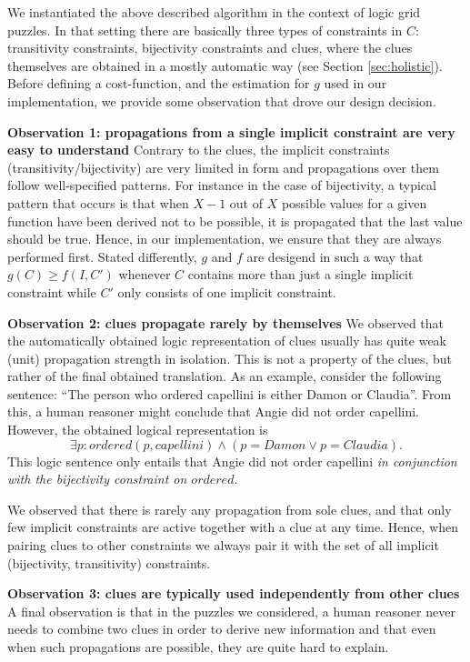 We instantiated the above described algorithm in the context of logic grid puzzles. 
In that setting there are basically three types of constraints in $C$: transitivity constraints, bijectivity constraints and clues, where the clues themselves are obtained in a mostly automatic way (see Section \ref{sec:holistic}). 
Before defining a cost-function, and the estimation for $g$ used in our implementation, we provide some observation that drove our design decision. 

\textbf{Observation 1: propagations from a single implicit constraint are very easy to understand} Contrary to the clues, the implicit constraints (transitivity/bijectivity) are very limited in form and propagations over them follow well-specified patterns. 
For instance in the case of bijectivity, a typical pattern that occurs is that when $X-1$ out of $X$ possible values for a given function have been derived not to be possible, it is propagated that the last value should be true. 
Hence, in our implementation, we ensure that they are always performed first. Stated differently, $g$ and $f$ are desigend in such a way that $g(C)\geq f(I,C')$ whenever $C$ contains more than just a single implicit constraint while $C'$ only consists of one implicit constraint.  

\textbf{Observation 2: clues propagate rarely by themselves}
We observed that the automatically obtained logic representation of clues usually has quite weak (unit) propagation strength in isolation. 
This is not a property of the clues, but rather of the final obtained translation. As an example, consider the following sentence: 
``The person who ordered capellini is either Damon or Claudia''. From this, a human reasoner might conclude that Angie did not order capellini. 
However, the obtained logical representation is 
\[\exists p: ordered(p,capellini)\land (p = Damon\lor p = Claudia).\]
This logic sentence only entails that Angie did not order capellini \emph{in conjunction with the bijectivity constraint on $ordered$}. 

We observed that there is rarely any propagation from sole clues, and that only few implicit constraints are active together with a clue at any time. Hence, when pairing clues to other constraints we always pair it with the set of all implicit (bijectivity, transitivity) constraints.

\textbf{Observation 3: clues are typically used independently from other clues} 
A final observation is that in the puzzles we considered, a human reasoner never needs to combine two clues in order to derive new information and that even when such propagations are possible, they are quite hard to explain. 

